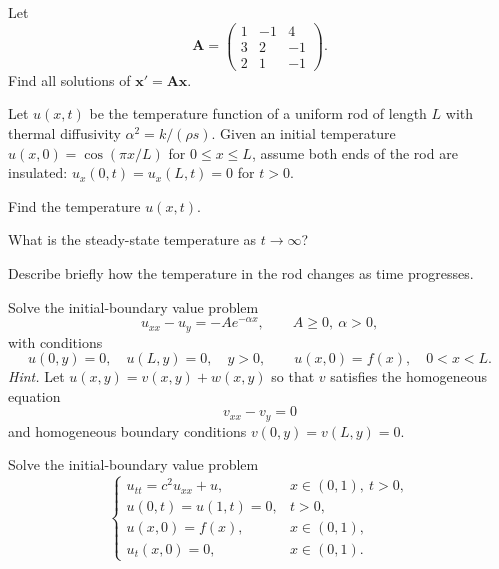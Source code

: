 \documentclass[11pt,oneside]{article}
\begin{document}
\begin{problem}
Let
\[\mathbf A=\begin{pmatrix}1&-1&4\\3&2&-1\\2&1&-1\end{pmatrix}.\]
Find all solutions of $\mathbf x'=\mathbf A\mathbf x$.
\end{problem}

\begin{problem}
Let $u(x,t)$ be the temperature function of a uniform rod of length $L$ with thermal diffusivity $\alpha^2=k/(\rho s)$. Given an initial temperature $u(x,0)=\cos(\pi x/L)$ for $0\le x\le L$, assume both ends of the rod are insulated: $u_x(0,t)=u_x(L,t)=0$ for $t>0$.
\begin{problemsubparts}
\item Find the temperature $u(x,t)$.
\item What is the steady-state temperature as $t\to\infty$?
\item Describe briefly how the temperature in the rod changes as time progresses.
\end{problemsubparts}
\end{problem}

\begin{problem}
Solve the initial-boundary value problem
\[u_{xx}-u_y=-Ae^{-\alpha x},\qquad A\ge0,\ \alpha>0,\]
with conditions
\[u(0,y)=0,\quad u(L,y)=0,\quad y>0,\qquad u(x,0)=f(x),\quad 0<x<L.\]
\textit{Hint.} Let $u(x,y)=v(x,y)+w(x,y)$ so that $v$ satisfies the homogeneous equation
\[v_{xx}-v_y=0\]
and homogeneous boundary conditions $v(0,y)=v(L,y)=0$.
\end{problem}

\begin{problem}
Solve the initial-boundary value problem
\[\begin{cases}u_{tt}=c^2u_{xx}+u,&x\in(0,1),\ t>0,\\u(0,t)=u(1,t)=0,&t>0,\\u(x,0)=f(x),&x\in(0,1),\\u_t(x,0)=0,&x\in(0,1).\end{cases}\]
\end{problem}
\end{document}
